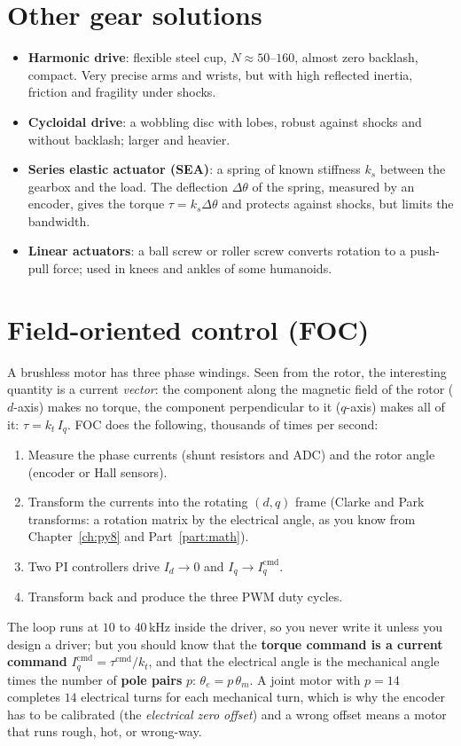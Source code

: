 \section*{Other gear solutions}
\begin{itemize}[nosep]
\item \textbf{Harmonic drive}: flexible steel cup, $N\approx50$--$160$, almost zero backlash, compact. Very precise arms and wrists, but with high reflected inertia, friction and fragility under shocks.
\item \textbf{Cycloidal drive}: a wobbling disc with lobes, robust against shocks and without backlash; larger and heavier.
\item \textbf{Series elastic actuator (SEA)}: a spring of known stiffness $k_s$ between the gearbox and the load. The deflection $\Delta\theta$ of the spring, measured by an encoder, gives the torque $\tau=k_s\Delta\theta$ and protects against shocks, but limits the bandwidth.
\item \textbf{Linear actuators}: a ball screw or roller screw converts rotation to a push-pull force; used in knees and ankles of some humanoids.
\end{itemize}

\section*{Field-oriented control (FOC)}
A brushless motor has three phase windings. Seen from the rotor, the interesting quantity is a current \emph{vector}: the component along the magnetic field of the rotor ($d$-axis) makes no torque, the component perpendicular to it ($q$-axis) makes all of it: $\tau=k_t\,I_q$. FOC does the following, thousands of times per second:
\begin{enumerate}[nosep]
\item Measure the phase currents (shunt resistors and ADC) and the rotor angle (encoder or Hall sensors).
\item Transform the currents into the rotating $(d,q)$ frame (Clarke and Park transforms: a rotation matrix by the electrical angle, as you know from Chapter~\ref{ch:py8} and Part~\ref{part:math}).
\item Two PI controllers drive $I_d\to0$ and $I_q\to I_q^\text{cmd}$.
\item Transform back and produce the three PWM duty cycles.
\end{enumerate}
The loop runs at $10$ to $40$\,kHz inside the driver, so you never write it unless you design a driver; but you should know that the \textbf{torque command is a current command} $I_q^\text{cmd}=\tau^\text{cmd}/k_t$, and that the electrical angle is the mechanical angle times the number of \textbf{pole pairs} $p$: $\theta_e=p\,\theta_m$. A joint motor with $p=14$ completes $14$ electrical turns for each mechanical turn, which is why the encoder has to be calibrated (the \emph{electrical zero offset}) and a wrong offset means a motor that runs rough, hot, or wrong-way.


